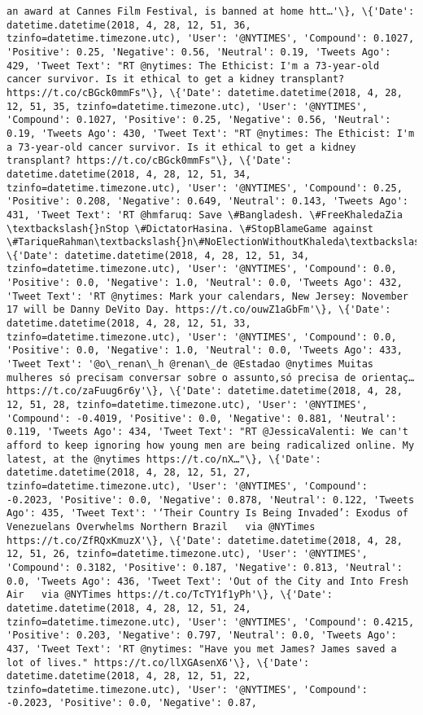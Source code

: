 \documentclass[11pt]{article}
\begin{document}
\begin{Verbatim}[commandchars=\\\{\}]
an award at Cannes Film Festival, is banned at home htt…'\}, \{'Date': datetime.datetime(2018, 4, 28, 12, 51, 36, tzinfo=datetime.timezone.utc), 'User': '@NYTIMES', 'Compound': 0.1027, 'Positive': 0.25, 'Negative': 0.56, 'Neutral': 0.19, 'Tweets Ago': 429, 'Tweet Text': "RT @nytimes: The Ethicist: I'm a 73-year-old cancer survivor. Is it ethical to get a kidney transplant? https://t.co/cBGck0mmFs"\}, \{'Date': datetime.datetime(2018, 4, 28, 12, 51, 35, tzinfo=datetime.timezone.utc), 'User': '@NYTIMES', 'Compound': 0.1027, 'Positive': 0.25, 'Negative': 0.56, 'Neutral': 0.19, 'Tweets Ago': 430, 'Tweet Text': "RT @nytimes: The Ethicist: I'm a 73-year-old cancer survivor. Is it ethical to get a kidney transplant? https://t.co/cBGck0mmFs"\}, \{'Date': datetime.datetime(2018, 4, 28, 12, 51, 34, tzinfo=datetime.timezone.utc), 'User': '@NYTIMES', 'Compound': 0.25, 'Positive': 0.208, 'Negative': 0.649, 'Neutral': 0.143, 'Tweets Ago': 431, 'Tweet Text': 'RT @hmfaruq: Save \#Bangladesh. \#FreeKhaledaZia  \textbackslash{}nStop \#DictatorHasina. \#StopBlameGame against \#TariqueRahman\textbackslash{}n\#NoElectionWithoutKhaleda\textbackslash{}n\textbackslash{}n@th…'\}, \{'Date': datetime.datetime(2018, 4, 28, 12, 51, 34, tzinfo=datetime.timezone.utc), 'User': '@NYTIMES', 'Compound': 0.0, 'Positive': 0.0, 'Negative': 1.0, 'Neutral': 0.0, 'Tweets Ago': 432, 'Tweet Text': 'RT @nytimes: Mark your calendars, New Jersey: November 17 will be Danny DeVito Day. https://t.co/ouwZ1aGbFm'\}, \{'Date': datetime.datetime(2018, 4, 28, 12, 51, 33, tzinfo=datetime.timezone.utc), 'User': '@NYTIMES', 'Compound': 0.0, 'Positive': 0.0, 'Negative': 1.0, 'Neutral': 0.0, 'Tweets Ago': 433, 'Tweet Text': '@o\_renan\_h @renan\_de @Estadao @nytimes Muitas mulheres só precisam conversar sobre o assunto,só precisa de orientaç… https://t.co/zaFuug6r6y'\}, \{'Date': datetime.datetime(2018, 4, 28, 12, 51, 28, tzinfo=datetime.timezone.utc), 'User': '@NYTIMES', 'Compound': -0.4019, 'Positive': 0.0, 'Negative': 0.881, 'Neutral': 0.119, 'Tweets Ago': 434, 'Tweet Text': "RT @JessicaValenti: We can't afford to keep ignoring how young men are being radicalized online. My latest, at the @nytimes https://t.co/nX…"\}, \{'Date': datetime.datetime(2018, 4, 28, 12, 51, 27, tzinfo=datetime.timezone.utc), 'User': '@NYTIMES', 'Compound': -0.2023, 'Positive': 0.0, 'Negative': 0.878, 'Neutral': 0.122, 'Tweets Ago': 435, 'Tweet Text': '‘Their Country Is Being Invaded’: Exodus of Venezuelans Overwhelms Northern Brazil   via @NYTimes https://t.co/ZfRQxKmuzX'\}, \{'Date': datetime.datetime(2018, 4, 28, 12, 51, 26, tzinfo=datetime.timezone.utc), 'User': '@NYTIMES', 'Compound': 0.3182, 'Positive': 0.187, 'Negative': 0.813, 'Neutral': 0.0, 'Tweets Ago': 436, 'Tweet Text': 'Out of the City and Into Fresh Air   via @NYTimes https://t.co/TcTY1f1yPh'\}, \{'Date': datetime.datetime(2018, 4, 28, 12, 51, 24, tzinfo=datetime.timezone.utc), 'User': '@NYTIMES', 'Compound': 0.4215, 'Positive': 0.203, 'Negative': 0.797, 'Neutral': 0.0, 'Tweets Ago': 437, 'Tweet Text': 'RT @nytimes: "Have you met James? James saved a lot of lives." https://t.co/llXGAsenX6'\}, \{'Date': datetime.datetime(2018, 4, 28, 12, 51, 22, tzinfo=datetime.timezone.utc), 'User': '@NYTIMES', 'Compound': -0.2023, 'Positive': 0.0, 'Negative': 0.87, 
\end{Verbatim}
\end{document}
